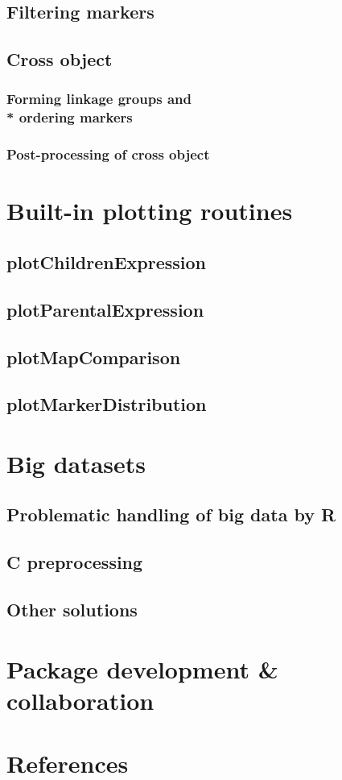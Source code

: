 \documentclass{article}
\begin{document}
\subsection{Filtering markers}
\blindtext
\subsection{Cross object}
\blindtext
\subsubsection{Forming linkage groups and \\* ordering markers}
\blindtext
\subsubsection{Post-processing of cross object}
\blindtext

\newpage
\section{Built-in plotting routines}
\subsection{plotChildrenExpression}
\blindtext[2]
\subsection{plotParentalExpression}
\blindtext[2]
\subsection{plotMapComparison}
\blindtext[2]
\subsection{plotMarkerDistribution}
\blindtext[2]
\newpage
\section{Big datasets}

\subsection{Problematic handling of big data by R}
\blindtext
\subsection{C preprocessing}
\blindtext
\subsection{Other solutions}
\blindtext

\newpage
\section{Package development \& collaboration}
\newpage
\section{References}


\end{document}
